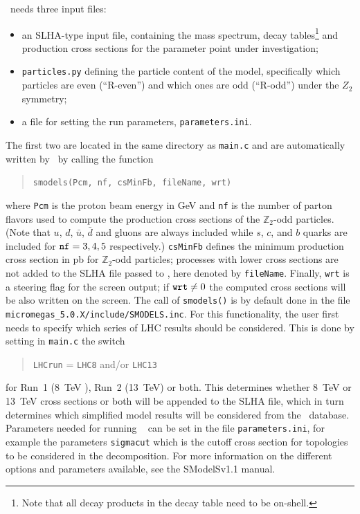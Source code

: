 \documentclass[12pt,a4paper]{article}
\begin{document}
\smodels\ needs three input files:
%
\begin{itemize}
\item an SLHA-type input file,  
containing the mass
spectrum, decay tables\footnote{Note that all decay products in the decay table need to be on-shell.} and production cross sections for the parameter point under investigation;
\item {\tt particles.py} defining the particle content of the model, specifically which particles are even (``R-even'') 
and which ones are odd (``R-odd'') under the ${Z}_2$ symmetry;
\item a file for setting the run parameters, {\tt parameters.ini}.
\end{itemize}
%
 The first two are located in the same directory as {\tt main.c} and 
are automatically written by \micro\ by calling the function
\begin{quote}
  \verb|smodels(Pcm, nf, csMinFb, fileName, wrt)|
\end{quote}  
where \verb|Pcm| is the proton beam energy in GeV and \verb|nf| is the number of parton flavors used to compute the production cross sections of the $\mathbb{Z}_2$-odd particles. 
(Note that $u$, $d$, $\bar{u}$, $\bar{d}$  and gluons are always included  while  $s$, $c$, and $b$ quarks are included for ${\tt nf} = 3,4,5$ respectively.)
{\tt csMinFb} defines the minimum production cross section in pb for $\mathbb{Z}_2$-odd   particles; processes with lower cross sections are not added to the SLHA file passed to \smodels, here denoted by  {\tt fileName}. 
Finally, {\tt wrt} is a steering flag for the screen output; if ${\tt wrt} \ne 0$  the computed cross sections will be also written on the screen. 
The call of \verb|smodels()| is by default done in the file \verb|micromegas_5.0.X/include/SMODELS.inc|.
For this functionality, the user first needs to specify which series of LHC results should be considered.
This is done by setting in {\tt main.c} the switch
 \begin{quote}
    \verb|LHCrun| = \verb|LHC8| and/or \verb|LHC13| 
 \end{quote}
 for Run~1 (8~TeV ), Run~2 (13~TeV) or both. This determines whether
 8~TeV or 13~TeV cross sections or both
 will be appended to the SLHA file, which in turn determines which
 simplified model results will be considered from the \smodels\
 database.
 Parameters needed for running \smodels~ can be set in the file \verb|parameters.ini|, for example  the parameters \verb|sigmacut|
which  is the cutoff cross section for topologies to be considered in the decomposition.
For more information on the different options and parameters available, see the  SModelSv1.1 manual\cite{Ambrogi:2017neo}.
\end{document}
